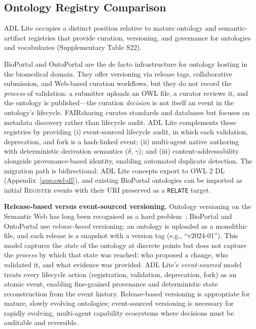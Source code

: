 \subsection{Ontology Registry Comparison}\label{subsec:registry-comparison}

ADL Lite occupies a distinct position relative to mature ontology and semantic-artifact registries that provide curation, versioning, and governance for ontologies and vocabularies (Supplementary Table S22).

BioPortal and OntoPortal \cite{bioportal,ontoportal} are the de facto infrastructure for ontology hosting in the biomedical domain. They offer versioning via release tags, collaborative submission, and Web-based curation workflows, but they do not record the \emph{process} of validation: a submitter uploads an OWL file, a curator reviews it, and the ontology is published---the curation \emph{decision} is not itself an event in the ontology's lifecycle. FAIRsharing \cite{fairsharing} curates standards and databases but focuses on metadata discovery rather than lifecycle audit. ADL Lite complements these registries by providing (i) event-sourced lifecycle audit, in which each validation, deprecation, and fork is a hash-linked event; (ii) multi-agent native authoring with deterministic derivation semantics ($\delta$, $\gamma$); and (iii) content-addressability alongside provenance-based identity, enabling automated duplicate detection. The migration path is bidirectional: ADL Lite concepts export to OWL 2 DL (Appendix~\ref{app:owl-dl}), and existing BioPortal ontologies can be imported as initial \textsc{Register} events with their URI preserved as a \texttt{RELATE} target.

\textbf{Release-based versus event-sourced versioning.} Ontology versioning on the Semantic Web has long been recognised as a hard problem~\cite{klein_fensel_2001}; BioPortal and OntoPortal use \emph{release-based} versioning: an ontology is uploaded as a monolithic file, and each release is a snapshot with a version tag (e.g., ``v2024-01''). This model captures the \emph{state} of the ontology at discrete points but does not capture the \emph{process} by which that state was reached: who proposed a change, who validated it, and what evidence was provided. ADL Lite's \emph{event-sourced} model treats every lifecycle action (registration, validation, deprecation, fork) as an atomic event, enabling fine-grained provenance and deterministic state reconstruction from the event history. Release-based versioning is appropriate for mature, slowly evolving ontologies; event-sourced versioning is necessary for rapidly evolving, multi-agent capability ecosystems where decisions must be auditable and reversible.

